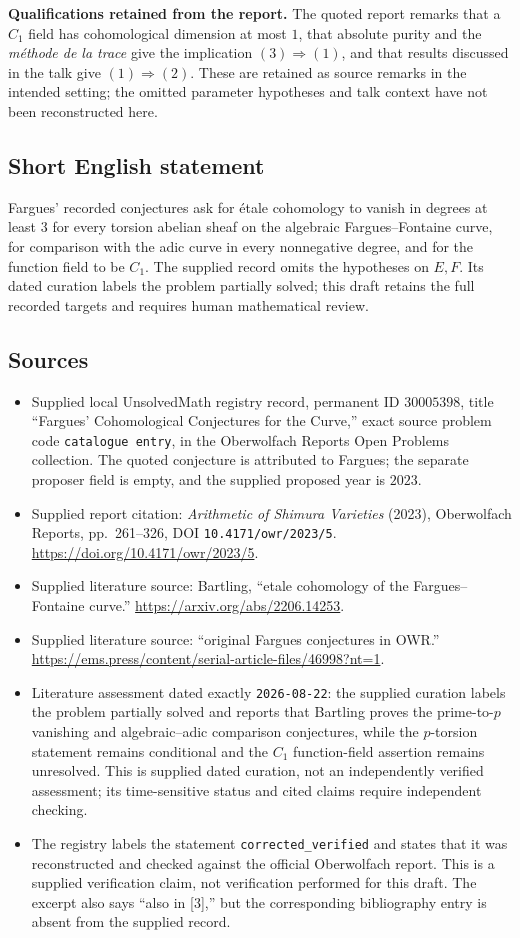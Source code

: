 \documentclass[11pt]{article}
\begin{document}
\textbf{Qualifications retained from the report.} The quoted report remarks that a \(C_1\) field has cohomological dimension at most \(1\), that absolute purity and the \emph{méthode de la trace} give the implication \((3)\Rightarrow(1)\), and that results discussed in the talk give \((1)\Rightarrow(2)\). These are retained as source remarks in the intended setting; the omitted parameter hypotheses and talk context have not been reconstructed here.
\subsection{Short English statement}
Fargues' recorded conjectures ask for étale cohomology to vanish in degrees at least \(3\) for every torsion abelian sheaf on the algebraic Fargues--Fontaine curve, for comparison with the adic curve in every nonnegative degree, and for the function field to be \(C_1\). The supplied record omits the hypotheses on \(E,F\). Its dated curation labels the problem partially solved; this draft retains the full recorded targets and requires human mathematical review.
\subsection{Sources}
\begin{itemize}
\item Supplied local UnsolvedMath registry record, permanent ID \(30005398\), title ``Fargues' Cohomological Conjectures for the Curve,'' exact source problem code \texttt{catalogue entry}, in the Oberwolfach Reports Open Problems collection. The quoted conjecture is attributed to Fargues; the separate proposer field is empty, and the supplied proposed year is \(2023\).
\item Supplied report citation: \emph{Arithmetic of Shimura Varieties} (2023), Oberwolfach Reports, pp.\ 261--326, DOI \texttt{10.4171/owr/2023/5}. \url{https://doi.org/10.4171/owr/2023/5}.
\item Supplied literature source: Bartling, ``etale cohomology of the Fargues--Fontaine curve.'' \url{https://arxiv.org/abs/2206.14253}.
\item Supplied literature source: ``original Fargues conjectures in OWR.'' \url{https://ems.press/content/serial-article-files/46998?nt=1}.
\item Literature assessment dated exactly \texttt{2026-08-22}: the supplied curation labels the problem partially solved and reports that Bartling proves the prime-to-\(p\) vanishing and algebraic--adic comparison conjectures, while the \(p\)-torsion statement remains conditional and the \(C_1\) function-field assertion remains unresolved. This is supplied dated curation, not an independently verified assessment; its time-sensitive status and cited claims require independent checking.
\item The registry labels the statement \texttt{corrected\_verified} and states that it was reconstructed and checked against the official Oberwolfach report. This is a supplied verification claim, not verification performed for this draft. The excerpt also says ``also in [3],'' but the corresponding bibliography entry is absent from the supplied record.
\end{itemize}
\end{document}
